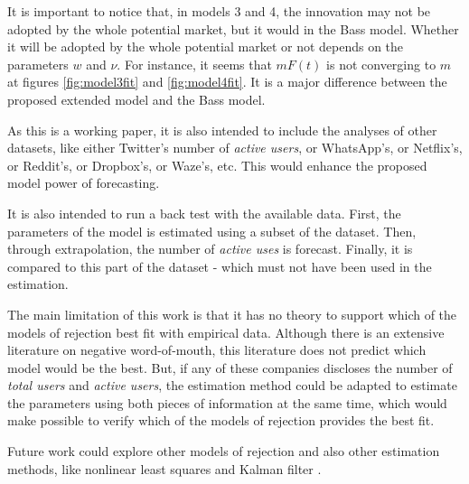 It is important to notice that, in models 3 and 4, the innovation may not be adopted by the whole potential market, but it would in the Bass model. Whether it will be adopted by the whole potential market or not depends on the parameters $w$ and $\nu$. For instance, it seems that $mF(t)$ is not converging to $m$ at figures \ref{fig:model3fit} and \ref{fig:model4fit}. It is a major difference between the proposed extended model and the Bass model.

As this is a working paper, it is also intended to include the analyses of other datasets, like either Twitter's number of \textit{active users}, or WhatsApp's, or Netflix's, or Reddit's, or Dropbox's, or Waze's, etc. This would enhance the proposed model power of forecasting.

It is also intended to run a back test with the available data. First, the parameters of the model is estimated using a subset of the dataset. Then, through extrapolation, the number of \textit{active uses} is forecast. Finally, it is compared to this part of the dataset - which must not have been used in the estimation.

The main limitation of this work is that it has no theory to support which of the models of rejection best fit with empirical data. Although there is an extensive literature on negative word-of-mouth, this literature does not predict which model would be the best. But, if any of these companies discloses the number of \textit{total users} and \textit{active users}, the estimation method could be adapted to estimate the parameters using both pieces of information at the same time, which would make possible to verify which of the models of rejection provides the best fit.

Future work could explore other models of rejection and also other estimation methods, like nonlinear least squares \citep{srinivasan1986technical} and Kalman filter \citep{xie1997kalman}.
